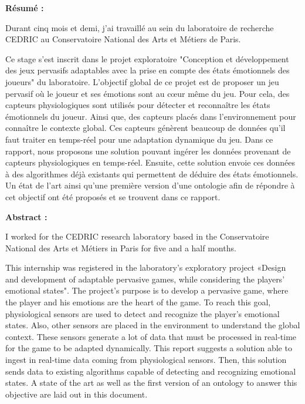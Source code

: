 \documentclass[11pt]{article}
\begin{document}
\newpage
\begin{center}
	\textbf{Résumé :}
\end{center}
\hspace*{0.4cm}
Durant cinq mois et demi, j'ai travaillé au sein du  laboratoire de recherche CEDRIC au Conservatoire National des Arts et Métiers de Paris.\par
Ce stage s'est inscrit dans le projet exploratoire "Conception et développement des jeux pervasifs adaptables avec la prise en compte des états émotionnels des joueurs" du laboratoire. 
L'objectif global de ce projet est de proposer un jeu pervasif où le joueur et ses émotions sont au cœur même du jeu. 
Pour cela, des capteurs physiologiques sont utilisés pour détecter et reconnaître les états émotionnels du joueur. Ainsi que, des capteurs placés dans l'environnement pour connaître le contexte global. 
Ces capteurs génèrent beaucoup de données qu'il faut traiter en temps-réel pour une adaptation dynamique du jeu.
Dans ce rapport, nous proposons une solution pouvant ingérer les données provenant de capteurs physiologiques en temps-réel.
Ensuite, cette solution envoie ces données à des algorithmes déjà existants qui permettent de déduire des états émotionnels.
Un état de l'art ainsi qu'une première version d'une ontologie afin de répondre à cet objectif ont été proposés et se trouvent dans ce rapport.
\vfill
\begin{center}
	\textbf{Abstract :}
\end{center}
\hspace*{0.4cm}
I worked for the CEDRIC research laboratory based in the Conservatoire National des Arts et Métiers in Paris for five and a half months.\par
This internship was registered in the laboratory's exploratory project «Design and development of adaptable pervasive games, while considering the players' emotional states".
The project’s purpose is to develop a pervasive game, where the player and his emotions are the heart of the game.
To reach this goal, physiological sensors are used to detect and recognize the player's emotional states.  Also, other sensors are placed in the environment to understand the global context.
These sensors generate a lot of data that must be processed in real-time for the game to be adapted dynamically. 
This report suggests a solution able to ingest in real-time data coming from physiological sensors.
Then, this solution sends data to existing algorithms capable of detecting and recognizing emotional states.
A state of the art as well as the first version of an ontology to answer this objective are laid out in this document. 
\end{document}
